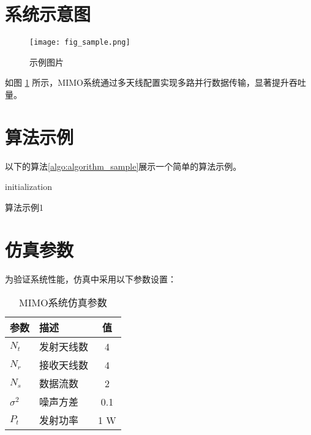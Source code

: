 \section{系统示意图}

\begin{figure}[ht]
  \centering
  \texttt{[image: fig\_sample.png]}
  \caption{示例图片}
  \label{fig:mimo_sample}
\end{figure}

如图 \ref{fig:mimo_sample} 所示，MIMO系统通过多天线配置实现多路并行数据传输，显著提升吞吐量。

\section{算法示例}

以下的算法\ref{algo:algorithm_sample}展示一个简单的算法示例。

\begin{algorithm}
  \algline
  initialization\;
  \caption{算法示例1}
  \label{algo:algorithm_sample}
\end{algorithm}



\section{仿真参数}

为验证系统性能，仿真中采用以下参数设置：

\begin{table}[ht]
  \centering
  \caption{MIMO系统仿真参数}
  \label{tab:mimo_parameters}
  \begin{tabular}{llc}
    \toprule
    参数 & 描述 & 值 \\
    \midrule
    \(N_t\) & 发射天线数 & 4 \\
    \(N_r\) & 接收天线数 & 4 \\
    \(N_s\) & 数据流数 & 2 \\
    \(\sigma^2\) & 噪声方差 & 0.1 \\
    \(P_t\) & 发射功率 & 1 W \\
    \bottomrule
  \end{tabular}
\end{table}